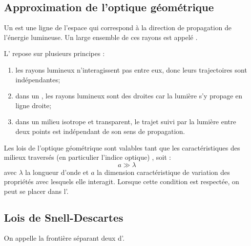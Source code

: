 \subsection{Approximation de l'optique géométrique}

\begin{definition}
Un  est une ligne de l'espace qui correspond à la direction de propagation de l'énergie lumineuse. Un large ensemble de ces rayons est appelé .
\end{definition}

\begin{definition}
L' repose sur plusieurs principes :

\begin{enumerate}[label=\tdef{(\roman*)}]
\item {} les rayons lumineux n'interagissent pas entre eux, donc leurs trajectoires sont indépendantes;
\item {} dans un , les rayons lumineux sont des droites car la lumière s'y propage en ligne droite;
\item {} dans un milieu isotrope et transparent, le trajet suivi par la lumière entre deux points est indépendant de son sens de propagation.
\end{enumerate}
\end{definition}

\begin{propriete}[admis]
Les lois de l'optique géométrique sont valables tant que les caractéristiques des milieux traversés (en particulier l'indice optique) , soit :
\[a \gg \lambda\]
avec $\lambda$ la longueur d'onde et $a$ la dimension caractéristique de variation des propriétés avec lesquels elle interagit. Lorsque cette condition est respectée, on peut se placer dans l'.
\end{propriete}



\subsection{Lois de Snell-Descartes}

\begin{definition}
On appelle  la frontière séparant deux  d'.
\end{definition}

